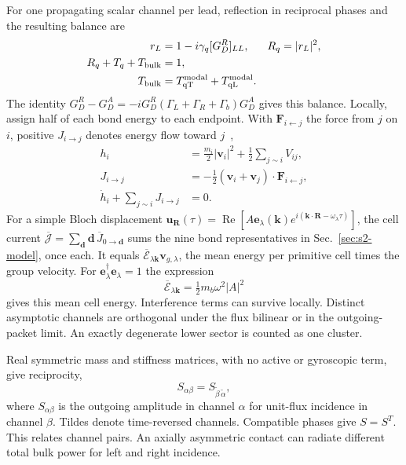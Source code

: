 \documentclass[10pt,aps,onecolumn,floatfix,notitlepage,nofootinbib,showkeys]{revtex4-2}
\newcommand{\vk}{\bm{k}}
\newcommand{\ve}{\bm{e}}
\newcommand{\qT}{\mathrm{qT}}
\newcommand{\qL}{\mathrm{qL}}
\begin{document}
For one propagating scalar channel per lead, reflection in reciprocal phases and the resulting balance are
\begin{align}
 r_L&=1-i\gamma_q[G_D^R]_{LL},
 &R_q&=|r_L|^2,\\
 R_q+T_q+T_{\rm bulk}&=1,
 \label{eq:s5-closure}\\
 T_{\rm bulk}&=T_{\qT}^{\rm modal}+T_{\qL}^{\rm modal}.
\end{align}
The identity $G_D^R-G_D^A=-iG_D^R(\Gamma_L+\Gamma_R+\Gamma_b)G_D^A$ gives this balance. Locally, assign half of each bond energy to each endpoint. With $\bm F_{i\leftarrow j}$ the force from $j$ on $i$, positive $J_{i\to j}$ denotes energy flow toward $j$~\cite{Hardy1963},
\begin{align}
 h_i&=\tfrac{m_i}{2}|\bm v_i|^2
 +\tfrac12\sum_{j\sim i}V_{ij},\\
 J_{i\to j}&=-\tfrac12(\bm v_i+\bm v_j)
 \cdot\bm F_{i\leftarrow j},
 \label{eq:bondcurrent}\\
 \dot h_i+\sum_{j\sim i}J_{i\to j}&=0.
\end{align}
For a simple Bloch displacement $\bm u_{\bm R}(\tau)=\operatorname{Re}[A\bm e_\lambda(\vk)e^{i(\vk\cdot\bm R-\omega_\lambda\tau)}]$, the cell current $\overline{\bm{\mathcal J}}=\sum_{\bm d}\bm d\,\overline J_{0\to\bm d}$ sums the nine bond representatives in Sec.~\ref{sec:s2-model}, once each. It equals $\overline{\mathcal E}_{\lambda\vk}\bm v_{g,\lambda}$, the mean energy per primitive cell times the group velocity. For $\ve_\lambda^\dagger\ve_\lambda=1$ the expression
\begin{equation}
  \overline{\mathcal E}_{\lambda\vk}
  =\tfrac12m_b\omega^2|A|^2
\end{equation}
gives this mean cell energy. Interference terms can survive locally. Distinct asymptotic channels are orthogonal under the flux bilinear or in the outgoing-packet limit. An exactly degenerate lower sector is counted as one cluster.

Real symmetric mass and stiffness matrices, with no active or gyroscopic term, give reciprocity,
\begin{equation}
 S_{\alpha\beta}=S_{\widetilde\beta\,\widetilde\alpha},
 \label{eq:reciprocity}
\end{equation}
where $S_{\alpha\beta}$ is the outgoing amplitude in channel $\alpha$ for unit-flux incidence in channel $\beta$. Tildes denote time-reversed channels. Compatible phases give $S=S^T$. This relates channel pairs. An axially asymmetric contact can radiate different total bulk power for left and right incidence.
\end{document}
